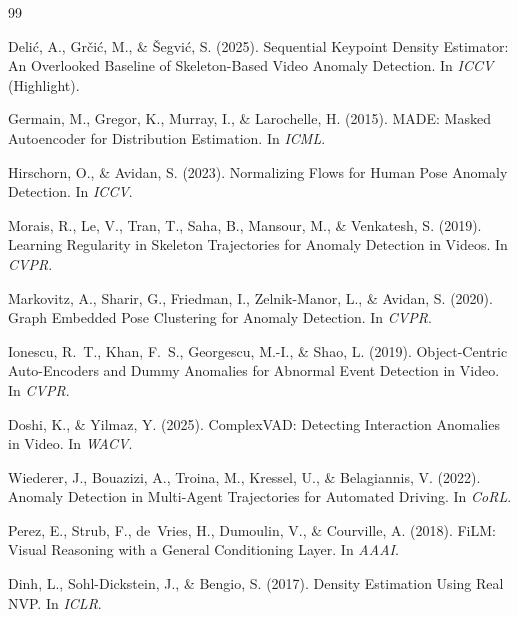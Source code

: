 \documentclass{article}
\begin{document}

\begin{thebibliography}{99}

Deli{\'c}, A., Gr{\v c}i{\'c}, M., \& {\v S}egvi{\'c}, S. (2025).
\newblock Sequential Keypoint Density Estimator: An Overlooked Baseline of
Skeleton-Based Video Anomaly Detection. In {\em ICCV} (Highlight).

Germain, M., Gregor, K., Murray, I., \& Larochelle, H. (2015).
\newblock MADE: Masked Autoencoder for Distribution Estimation. In {\em ICML}.

Hirschorn, O., \& Avidan, S. (2023).
\newblock Normalizing Flows for Human Pose Anomaly Detection. In {\em ICCV}.

Morais, R., Le, V., Tran, T., Saha, B., Mansour, M., \& Venkatesh, S. (2019).
\newblock Learning Regularity in Skeleton Trajectories for Anomaly Detection in
Videos. In {\em CVPR}.

Markovitz, A., Sharir, G., Friedman, I., Zelnik-Manor, L., \& Avidan, S. (2020).
\newblock Graph Embedded Pose Clustering for Anomaly Detection. In {\em CVPR}.

Ionescu, R.~T., Khan, F.~S., Georgescu, M.-I., \& Shao, L. (2019).
\newblock Object-Centric Auto-Encoders and Dummy Anomalies for Abnormal Event
Detection in Video. In {\em CVPR}.

Doshi, K., \& Yilmaz, Y. (2025).
\newblock ComplexVAD: Detecting Interaction Anomalies in Video. In {\em WACV}.

Wiederer, J., Bouazizi, A., Troina, M., Kressel, U., \& Belagiannis, V. (2022).
\newblock Anomaly Detection in Multi-Agent Trajectories for Automated Driving.
In {\em CoRL}.

Perez, E., Strub, F., de~Vries, H., Dumoulin, V., \& Courville, A. (2018).
\newblock FiLM: Visual Reasoning with a General Conditioning Layer. In {\em AAAI}.

Dinh, L., Sohl-Dickstein, J., \& Bengio, S. (2017).
\newblock Density Estimation Using Real NVP. In {\em ICLR}.


\end{thebibliography}
\end{document}
